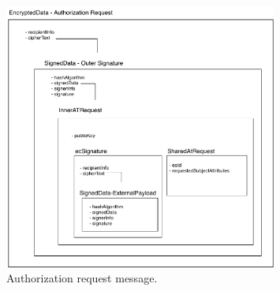 \begin{figure}[!htb]
	\centering
	\includegraphics[width=0.8\textwidth]{Figures/authorizationrequest}
	\caption{\label{fig:authorization_request}Authorization request message.}
\end{figure}


